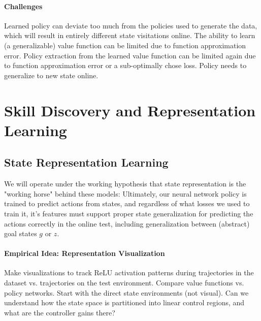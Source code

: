 \documentclass{article}
\theoremstyle{plain}
\theoremstyle{definition}
\theoremstyle{remark}
\begin{document}
\paragraph{Challenges} Learned policy can deviate too much from the policies used to generate the data, which will result in entirely different state visitations online. The ability to learn (a generalizable) value function can be limited due to function approximation error. Policy extraction from the learned value function can be limited again due to function approximation error or a sub-optimally chose loss. Policy needs to generalize to new state online.

\section{Skill Discovery and Representation Learning}

\subsection{State Representation Learning}
We will operate under the working hypothesis that state representation is the "working horse" behind these models: Ultimately, our neural network policy is trained to predict actions from states, and regardless of what losses we used to train it, it's features must support proper state generalization for predicting the actions correctly in the online test, including generalization between (abstract) goal states $g$ or $z$.

\paragraph{Empirical Idea: Representation Visualization} Make visualizations to track ReLU activation patterns during trajectories in the dataset vs. trajectories on the test environment. Compare value functions vs. policy networks. Start with the direct state environments (not visual). Can we understand how the state space is partitioned into linear control regions, and what are the controller gains there?
\end{document}
